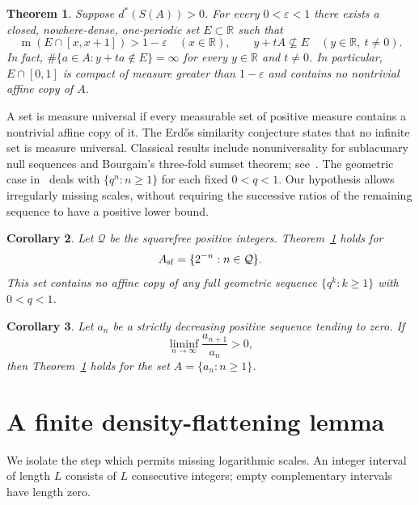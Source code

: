 \documentclass[11pt]{article}
\newtheorem{theorem}{Theorem}[section]
\newtheorem{corollary}[theorem]{Corollary}
\theoremstyle{remark}\newtheorem{remark}[theorem]{Remark}
\newcommand{\R}{\mathbb R}\newcommand{\N}{\mathbb N}
\DeclareMathOperator{\Leb}{m}
\begin{document}
\begin{theorem}\label{thm:main}
Suppose $d^*(S(A))>0$. For every $0<\varepsilon<1$ there exists a closed, nowhere-dense, one-periodic set $E\subset\R$ such that
\[
 \Leb(E\cap[x,x+1])>1-\varepsilon\quad(x\in\R),
 \qquad y+tA\not\subseteq E\quad(y\in\R,\ t\ne0).
\]
In fact, $\#\{a\in A:y+ta\notin E\}=\infty$ for every $y\in\R$ and $t\ne0$. In particular, $E\cap[0,1]$ is compact of measure greater than $1-\varepsilon$ and contains no nontrivial affine copy of $A$.
\end{theorem}

A set is measure universal if every measurable set of positive measure contains a nontrivial affine copy of it. The Erd\H{o}s similarity conjecture states that no infinite set is measure universal. Classical results include nonuniversality for sublacunary null sequences and Bourgain's three-fold sumset theorem; see~\cite{JLM}. The geometric case in~\cite{OpenAI084} deals with $\{q^n:n\ge1\}$ for each fixed $0<q<1$. Our hypothesis allows irregularly missing scales, without requiring the successive ratios of the remaining sequence to have a positive lower bound.

\begin{corollary}\label{cor:squarefree}
Let $\mathcal Q$ be the squarefree positive integers. Theorem~\ref{thm:main} holds for
\[
 A_{\rm sf}=\{2^{-n}:n\in\mathcal Q\}.
\]
This set contains no affine copy of any full geometric sequence $\{q^k:k\ge1\}$ with $0<q<1$.
\end{corollary}

\begin{corollary}\label{cor:ratios}
Let $a_n$ be a strictly decreasing positive sequence tending to zero. If
\[
 \liminf_{n\to\infty}\frac{a_{n+1}}{a_n}>0,
\]
then Theorem~\ref{thm:main} holds for the set $A=\{a_n:n\ge1\}$.
\end{corollary}

\section{A finite density-flattening lemma}
We isolate the step which permits missing logarithmic scales. An integer interval of length $L$ consists of $L$ consecutive integers; empty complementary intervals have length zero.
\end{document}
